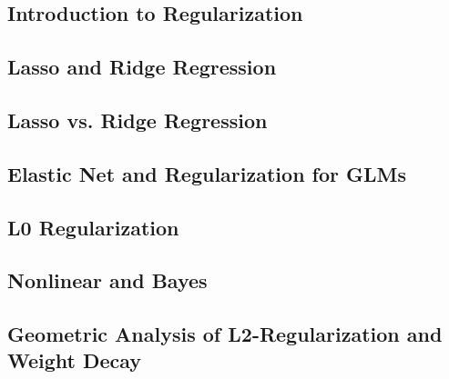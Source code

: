 

\subsection{Introduction to Regularization}


\subsection{Lasso and Ridge Regression}


\subsection{Lasso vs. Ridge Regression}


\subsection{Elastic Net and Regularization for GLMs}


%

\subsection{L0 Regularization}


\subsection{Nonlinear and Bayes}


\subsection{Geometric Analysis of L2-Regularization and Weight Decay}


